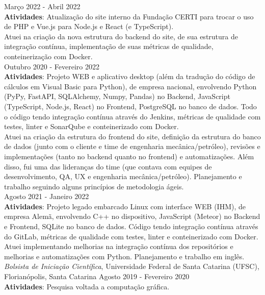 \documentclass[a4paper,10pt]{article}
\begin{document}
{        Março 2022 -  Abril 2022\\
        \textbf{Atividades}: Atualização do site interno da Fundação CERTI para trocar o uso de PHP e Vue.js para Node.js e React (e TypeScript).\\

        Atuei na criação da nova estrutura do backend do site, de sua estrutura de integração contínua, implementação de suas métricas de qualidade, conteinerização com Docker.\\

        Outubro 2020 - Fevereiro 2022\\
        \textbf{Atividades}: Projeto WEB e aplicativo desktop (além da tradução do código de cálculos em Visual Basic para Python), de empresa nacional, envolvendo Python (PyPy, FastAPI, SQLAlchemy, Numpy, Pandas) no Backend, JavaScript (TypeScript, Node.js, React) no Frontend, PostgreSQL no banco de dados. Todo o código tendo integração contínua através do Jenkins, métricas de qualidade com testes, linter e SonarQube e conteinerizado com Docker.\\

        Atuei na criação da estrutura do frontend do site, definição da estrutura do banco de dados (junto com o cliente e time de engenharia mecânica/petróleo), revisões e implementações (tanto no backend quanto no frontend) e automatizações. Além disso, fui uma das lideranças do time (que contava com equipes de desenvolvimento, QA, UX e engenharia mecânica/petróleo). Planejamento e trabalho seguindo alguns princípios de metodologia ágeis.\\

        Agosto 2021 - Janeiro 2022\\
        \textbf{Atividades}: Projeto legado embarcado Linux com interface WEB (IHM), de empresa Alemã, envolvendo C++ no dispositivo, JavaScript (Meteor) no Backend e Frontend, SQLite no banco de dados. Código tendo integração contínua através do GitLab, métricas de qualidade com testes, linter e conteinerizado com Docker.\\

        Atuei implementando melhorias na integração contínua dos repositórios e melhorias e automatizações com Python. Planejamento e trabalho em inglês.\\

        \textit{Bolsista de Iniciação Científica}, Universidade Federal de Santa Catarina (UFSC), Florianópolis, Santa Catarina \hfill Agosto 2019 - Fevereiro 2020 \\
		\textbf{Atividades}: Pesquisa voltada a computação gráfica.\\

}
\end{document}
